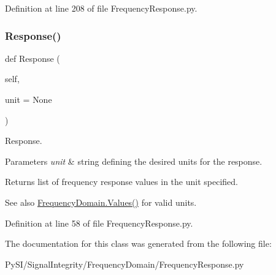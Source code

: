 Definition at line 208 of file Frequency\+Response.\+py.

\mbox{\label{classSignalIntegrity_1_1FrequencyDomain_1_1FrequencyResponse_1_1FrequencyResponse_ab4996cceccaa974296395d3039a9ca2a}} 
\subsubsection{\texorpdfstring{Response()}{Response()}}
{\footnotesize\ttfamily def Response (\begin{DoxyParamCaption}\item[{}]{self,  }\item[{}]{unit = {\ttfamily None} }\end{DoxyParamCaption})}



Response. 


\begin{DoxyParams}{Parameters}
{\em unit} & string defining the desired units for the response. \\
\hline
\end{DoxyParams}
\begin{DoxyReturn}{Returns}
list of frequency response values in the unit specified. 
\end{DoxyReturn}
\begin{DoxySeeAlso}{See also}
\hyperlink{classSignalIntegrity_1_1FrequencyDomain_1_1FrequencyDomain_1_1FrequencyDomain_a3dc7b1e5eba8fb649156094dfdf7a893}{Frequency\+Domain.\+Values()} for valid units. 
\end{DoxySeeAlso}


Definition at line 58 of file Frequency\+Response.\+py.



The documentation for this class was generated from the following file\+:\begin{DoxyCompactItemize}
\item 
Py\+S\+I/\+Signal\+Integrity/\+Frequency\+Domain/Frequency\+Response.\+py\end{DoxyCompactItemize}
